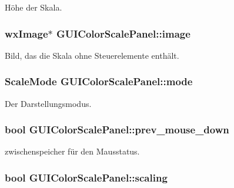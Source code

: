Höhe der Skala. \hypertarget{classGUIColorScalePanel_ac398e4b12cea263a89db6dd236ec1e87}{
\subsubsection[{image}]{\setlength{\rightskip}{0pt plus 5cm}wx\-Image$\ast$ G\-U\-I\-Color\-Scale\-Panel\-::image\hspace{0.3cm}{\ttfamily [private]}}}\label{classGUIColorScalePanel_ac398e4b12cea263a89db6dd236ec1e87}
Bild, das die Skala ohne Steuerelemente enthält. \hypertarget{classGUIColorScalePanel_ad2f795e0d3a1c8e731da16d3320dbd34}{
\subsubsection[{mode}]{\setlength{\rightskip}{0pt plus 5cm}Scale\-Mode G\-U\-I\-Color\-Scale\-Panel\-::mode\hspace{0.3cm}{\ttfamily [private]}}}\label{classGUIColorScalePanel_ad2f795e0d3a1c8e731da16d3320dbd34}
Der Darstellungsmodus. \hypertarget{classGUIColorScalePanel_ac7050aa7729236561154b0b9be894ed6}{
\subsubsection[{prev\-\_\-mouse\-\_\-down}]{\setlength{\rightskip}{0pt plus 5cm}bool G\-U\-I\-Color\-Scale\-Panel\-::prev\-\_\-mouse\-\_\-down\hspace{0.3cm}{\ttfamily [private]}}}\label{classGUIColorScalePanel_ac7050aa7729236561154b0b9be894ed6}
zwischenspeicher für den Mausstatus. \hypertarget{classGUIColorScalePanel_aec005c07c64a17ffe6d362f4de0a04b1}{
\subsubsection[{scaling}]{\setlength{\rightskip}{0pt plus 5cm}bool G\-U\-I\-Color\-Scale\-Panel\-::scaling\hspace{0.3cm}{\ttfamily [private]}}}\label{classGUIColorScalePanel_aec005c07c64a17ffe6d362f4de0a04b1}
